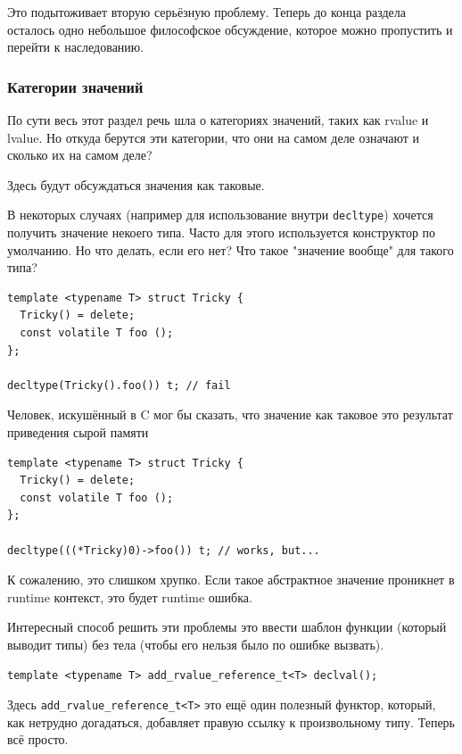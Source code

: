 \documentclass[a4paper,12pt,oneside]{article}
\begin{document}
Это подытоживает вторую серьёзную проблему. Теперь до конца раздела осталось одно небольшое философское обсуждение, которое можно пропустить и перейти к наследованию.

\subsubsection{Категории значений}

По сути весь этот раздел речь шла о категориях значений, таких как rvalue и lvalue. Но откуда берутся эти категории, что они на самом деле означают и сколько их на самом деле?

Здесь будут обсуждаться значения как таковые.

В некоторых случаях (например для использование внутри \lstinline!decltype!) хочется получить значение некоего типа. Часто для этого используется конструктор по умолчанию. Но что делать, если его нет? Что такое "значение вообще" для такого типа?

\begin{lstlisting}
template <typename T> struct Tricky {
  Tricky() = delete;
  const volatile T foo ();
};

decltype(Tricky().foo()) t; // fail
\end{lstlisting}

Человек, искушённый в C мог бы сказать, что значение как таковое это результат приведения сырой памяти

\begin{lstlisting}
template <typename T> struct Tricky {
  Tricky() = delete;
  const volatile T foo ();
};

decltype(((*Tricky)0)->foo()) t; // works, but...
\end{lstlisting}

К сожалению, это слишком хрупко. Если такое абстрактное значение проникнет в runtime контекст, это будет runtime ошибка.

Интересный способ решить эти проблемы это ввести шаблон функции (который выводит типы) без тела (чтобы его нельзя было по ошибке вызвать).

\begin{lstlisting}
template <typename T> add_rvalue_reference_t<T> declval();
\end{lstlisting}

Здесь \lstinline!add_rvalue_reference_t<T>! это ещё один полезный функтор, который, как нетрудно догадаться, добавляет правую ссылку к произвольному типу. Теперь всё просто.
\end{document}
